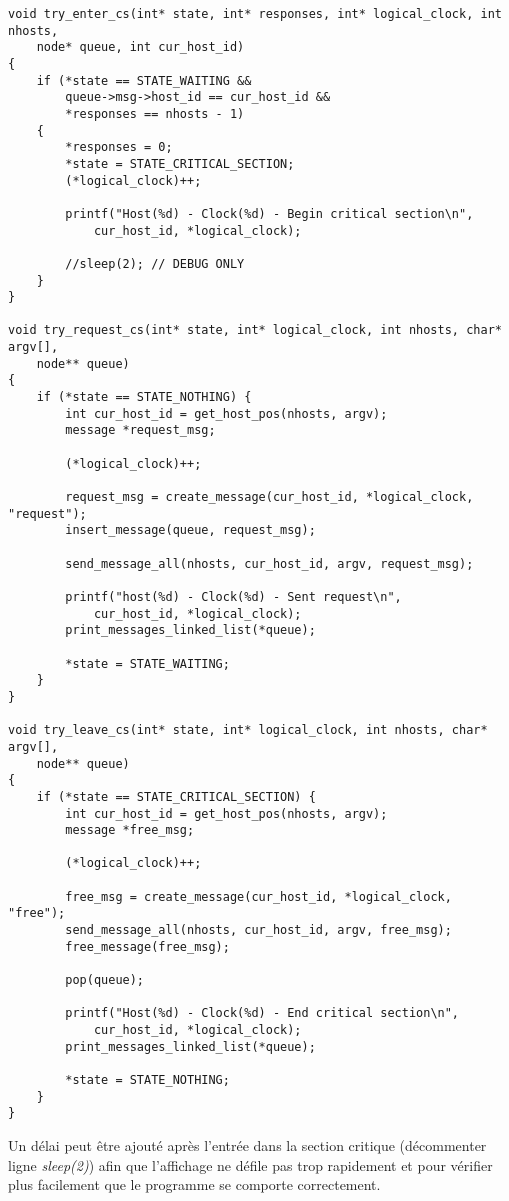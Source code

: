 \begin{lstlisting}[caption={Fonctions de mise à jour d'état}]
void try_enter_cs(int* state, int* responses, int* logical_clock, int nhosts,
    node* queue, int cur_host_id)
{
    if (*state == STATE_WAITING &&
        queue->msg->host_id == cur_host_id &&
        *responses == nhosts - 1)
    {
        *responses = 0;
        *state = STATE_CRITICAL_SECTION;
        (*logical_clock)++;

        printf("Host(%d) - Clock(%d) - Begin critical section\n",
            cur_host_id, *logical_clock);

        //sleep(2); // DEBUG ONLY
    }
}

void try_request_cs(int* state, int* logical_clock, int nhosts, char* argv[],
    node** queue)
{
    if (*state == STATE_NOTHING) {
        int cur_host_id = get_host_pos(nhosts, argv);
        message *request_msg;

        (*logical_clock)++;

        request_msg = create_message(cur_host_id, *logical_clock, "request");
        insert_message(queue, request_msg);

        send_message_all(nhosts, cur_host_id, argv, request_msg);

        printf("host(%d) - Clock(%d) - Sent request\n",
            cur_host_id, *logical_clock);
        print_messages_linked_list(*queue);

        *state = STATE_WAITING;
    }
}

void try_leave_cs(int* state, int* logical_clock, int nhosts, char* argv[],
    node** queue)
{
    if (*state == STATE_CRITICAL_SECTION) {
        int cur_host_id = get_host_pos(nhosts, argv);
        message *free_msg;

        (*logical_clock)++;

        free_msg = create_message(cur_host_id, *logical_clock, "free");
        send_message_all(nhosts, cur_host_id, argv, free_msg);
        free_message(free_msg);

        pop(queue);

        printf("Host(%d) - Clock(%d) - End critical section\n",
            cur_host_id, *logical_clock);
        print_messages_linked_list(*queue);

        *state = STATE_NOTHING;
    }
}
\end{lstlisting}

\begin{framehint}
Un délai peut être ajouté après l'entrée dans la section critique (décommenter ligne \emph{sleep(2)}) afin que l'affichage ne défile pas trop rapidement et pour vérifier plus facilement que le programme se comporte correctement.
\end{framehint}
